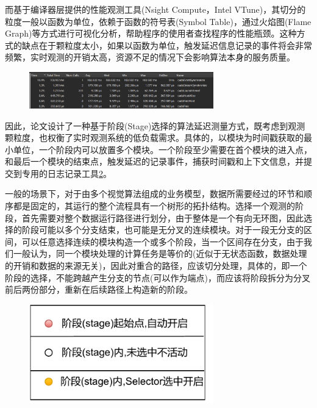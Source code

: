 \documentclass[master]{shtthesis}
\begin{document}
而基于编译器层提供的性能观测工具(Nsight Compute，Intel VTune\cite{reinders2005vtune})，其切分的粒度一般以函数为单位，依赖于函数的符号表(Symbol Table)，通过火焰图(Flame Graph)\cite{gregg2016flame}等方式进行可视化分析，帮助程序的使用者查找程序的性能瓶颈。这种方式的缺点在于颗粒度太小，如果以函数为单位，触发延迟信息记录的事件将会非常频繁，实时观测的开销太高，资源不足的情况下会影响算法本身的服务质量。
\begin{figure}[htbp]
	\centering
	\includegraphics[width=8cm]{img/nsight_func.png}
	\label{NsightCompute的观测结果}
\end{figure}


因此，论文设计了一种基于阶段(Stage)选择的算法延迟测量方式，既考虑到观测颗粒度，也权衡了实时观测系统的低负载需求。具体的，以模块为时间戳获取的最小单位，一个阶段内可以放置多个模块。一个阶段至少需要在首个模块的进入点，和最后一个模块的结束点，触发延迟的记录事件，捕获时间戳和上下文信息，并提交到专用的日志记录工具\ref{论文观测机制示意图图例}。

一般的场景下，对于由多个视觉算法组成的业务模型，数据所需要经过的环节和顺序都是固定的，其运行的整个流程具有一个树形的拓扑结构。选择一个观测的阶段，首先需要对整个数据运行路径进行划分，由于整体是一个有向无环图，因此选择的阶段可能以多个分支结束，也可能是无分叉的连续模块。对于一段无分支的区间，可以任意选择连续的模块构造一个或多个阶段，当一个区间存在分支，由于我们一般认为，同一个模块处理的计算任务是等价的(近似于无状态函数，数据处理的开销和数据的来源无关)，因此对重合的路径，应该切分处理，具体的，即一个阶段的选择，不能跨越产生分支的节点(可以作为端点)，而应该将阶段拆分为分叉前后两份部分，重新在后续路径上构造新的阶段。

\begin{figure}[htbp]
	\centering
	\includegraphics[width=8cm]{img/trace_l.pdf}
	\label{论文观测机制示意图图例}
\end{figure}
\end{document}
